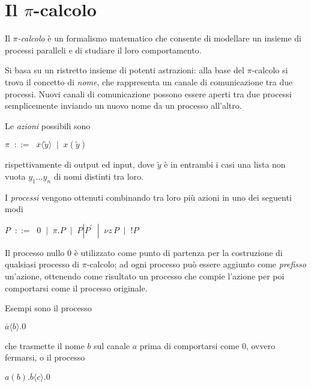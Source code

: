 \section{Il \texorpdfstring{$\pi$}{pi}-calcolo}

Il \emph{$\pi$-calcolo} \`e un formalismo matematico che consente di
modellare un insieme di processi paralleli e di studiare il loro
comportamento.

Si basa su un ristretto insieme di potenti astrazioni: alla base del
$\pi$-calcolo si trova il concetto di \emph{nome}, che rappresenta un
canale di comunicazione tra due processi. Nuovi canali di comunicazione
possono essere aperti tra due processi semplicemente inviando un nuovo
nome da un processo all'altro.

Le \emph{azioni} possibili sono

\begin{pilisting}
$
    \pi \;\; ::= \;\; \overline{x}\langle\tilde{y}\rangle
        \;\; |   \;\; x(\tilde{y})
$
\end{pilisting}

rispettivamente di output ed input, dove $\tilde{y}$ \`e in entrambi i casi
una lista non vuota $ y_1 \ldots y_n$ di nomi distinti tra loro.

I \emph{processi} vengono ottenuti combinando tra loro pi\`u azioni in uno
dei seguenti modi

\begin{pilisting}
$
    P \;\; ::= \;\; 0
      \;\; |   \;\; \pi.P
      \;\; |   \;\; P|P^{'}
      \;\; |   \;\; \nu z \, P
      \;\; |   \;\; !P
$
\end{pilisting}

Il processo nullo $0$ \`e utilizzato come punto di partenza per la
costruzione di qualsiasi processo di $\pi$-calcolo; ad ogni processo pu\`o
essere aggiunto come \emph{prefisso} un'azione, ottenendo come risultato un
processo che compie l'azione per poi comportarsi come il processo originale.

Esempi sono il processo

\begin{pilisting}
$
    \overline{a}\langle b\rangle.0
$
\end{pilisting}

che trasmette il nome $b$ sul canale $a$ prima di comportarsi come $0$,
ovvero fermarsi, o il processo

\begin{pilisting}
$
    a(b).\overline{b}\langle c\rangle.0
$
\end{pilisting}

